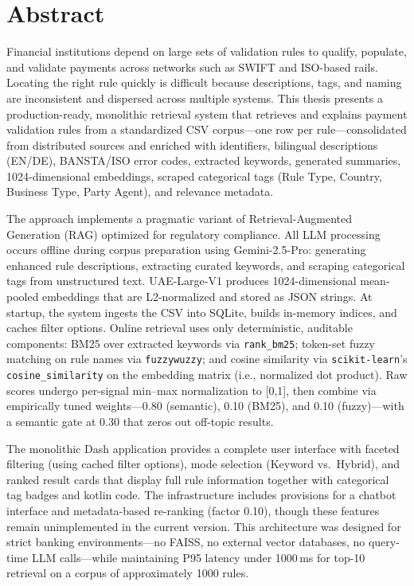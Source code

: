 \chapter*{Abstract}

Financial institutions depend on large sets of validation rules to qualify, populate, and validate payments across networks such as SWIFT and ISO-based rails. Locating the right rule quickly is difficult because descriptions, tags, and naming are inconsistent and dispersed across multiple systems. This thesis presents a production-ready, monolithic retrieval system that retrieves and explains payment validation rules from a standardized CSV corpus—one row per rule—consolidated from distributed sources and enriched with identifiers, bilingual descriptions (EN/DE), BANSTA/ISO error codes, extracted keywords, generated summaries, 1024-dimensional embeddings, scraped categorical tags (Rule Type, Country, Business Type, Party Agent), and relevance metadata.

The approach implements a pragmatic variant of Retrieval-Augmented Generation (RAG) optimized for regulatory compliance. All LLM processing occurs offline during corpus preparation using Gemini-2.5-Pro: generating enhanced rule descriptions, extracting curated keywords, and scraping categorical tags from unstructured text. UAE-Large-V1 produces 1024-dimensional mean-pooled embeddings that are L2-normalized and stored as JSON strings. At startup, the system ingests the CSV into SQLite, builds in-memory indices, and caches filter options. Online retrieval uses only deterministic, auditable components: BM25 over extracted keywords via \texttt{rank\_bm25}; token-set fuzzy matching on rule names via \texttt{fuzzywuzzy}; and cosine similarity via \texttt{scikit-learn}'s \texttt{cosine\_similarity} on the embedding matrix (i.e., normalized dot product). Raw scores undergo per-signal min–max normalization to [0,1], then combine via empirically tuned weights—0.80 (semantic), 0.10 (BM25), and 0.10 (fuzzy)—with a semantic gate at 0.30 that zeros out off-topic results.

The monolithic Dash application provides a complete user interface with faceted filtering (using cached filter options), mode selection (Keyword vs.\ Hybrid), and ranked result cards that display full rule information together with categorical tag badges and kotlin code. The infrastructure includes provisions for a chatbot interface and metadata-based re-ranking (factor 0.10), though these features remain unimplemented in the current version. This architecture was designed for strict banking environments—no FAISS, no external vector databases, no query-time LLM calls—while maintaining P95 latency under 1000\,ms for top-10 retrieval on a corpus of approximately 1000 rules.

